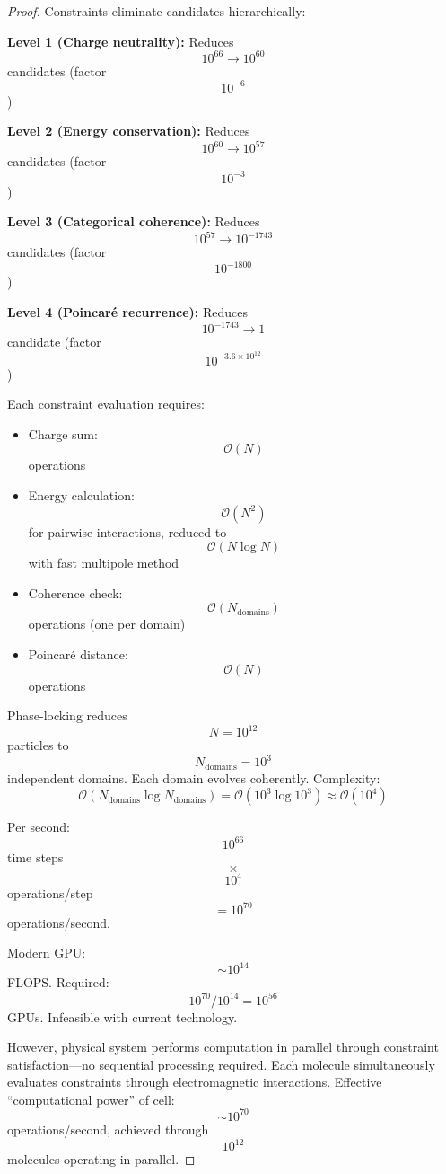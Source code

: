 \documentclass[11pt,twocolumn,a4paper]{article}
\theoremstyle{remark}
\begin{document}
\begin{proof}
Constraints eliminate candidates hierarchically:

\textbf{Level 1 (Charge neutrality):} Reduces $$10^{66} \to 10^{60}$$ candidates (factor $$10^{-6}$$)

\textbf{Level 2 (Energy conservation):} Reduces $$10^{60} \to 10^{57}$$ candidates (factor $$10^{-3}$$)

\textbf{Level 3 (Categorical coherence):} Reduces $$10^{57} \to 10^{-1743}$$ candidates (factor $$10^{-1800}$$)

\textbf{Level 4 (Poincaré recurrence):} Reduces $$10^{-1743} \to 1$$ candidate (factor $$10^{-3.6 \times 10^{12}}$$)

Each constraint evaluation requires:
\begin{itemize}
\item Charge sum: $$\mathcal{O}(N)$$ operations
\item Energy calculation: $$\mathcal{O}(N^2)$$ for pairwise interactions, reduced to $$\mathcal{O}(N \log N)$$ with fast multipole method
\item Coherence check: $$\mathcal{O}(N_{\mathrm{domains}})$$ operations (one per domain)
\item Poincaré distance: $$\mathcal{O}(N)$$ operations
\end{itemize}

Phase-locking reduces $$N = 10^{12}$$ particles to $$N_{\mathrm{domains}} = 10^3$$ independent domains. Each domain evolves coherently. Complexity:
$$
\mathcal{O}(N_{\mathrm{domains}} \log N_{\mathrm{domains}}) = \mathcal{O}(10^3 \log 10^3) \approx \mathcal{O}(10^4)
$$

Per second: $$10^{66}$$ time steps $$\times$$ $$10^4$$ operations/step $$= 10^{70}$$ operations/second.

Modern GPU: $$\sim 10^{14}$$ FLOPS. Required: $$10^{70}/10^{14} = 10^{56}$$ GPUs. Infeasible with current technology.

However, physical system performs computation in parallel through constraint satisfaction---no sequential processing required. Each molecule simultaneously evaluates constraints through electromagnetic interactions. Effective ``computational power'' of cell: $$\sim 10^{70}$$ operations/second, achieved through $$10^{12}$$ molecules operating in parallel.
\end{proof}
\end{document}
